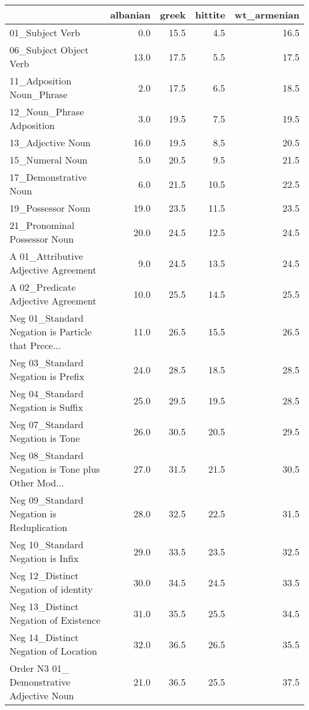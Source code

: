 \begin{tabular}{lrrrr}
\toprule
{} &  albanian &  greek &  hittite &  wt\_armenian \\
\midrule
01\_Subject Verb                                    &       0.0 &   15.5 &      4.5 &         16.5 \\
06\_Subject Object Verb                             &      13.0 &   17.5 &      5.5 &         17.5 \\
11\_Adposition Noun\_Phrase                          &       2.0 &   17.5 &      6.5 &         18.5 \\
12\_Noun\_Phrase Adposition                          &       3.0 &   19.5 &      7.5 &         19.5 \\
13\_Adjective Noun                                  &      16.0 &   19.5 &      8.5 &         20.5 \\
15\_Numeral Noun                                    &       5.0 &   20.5 &      9.5 &         21.5 \\
17\_Demonstrative Noun                              &       6.0 &   21.5 &     10.5 &         22.5 \\
19\_Possessor Noun                                  &      19.0 &   23.5 &     11.5 &         23.5 \\
21\_Pronominal Possessor Noun                       &      20.0 &   24.5 &     12.5 &         24.5 \\
A 01\_Attributive Adjective Agreement               &       9.0 &   24.5 &     13.5 &         24.5 \\
A 02\_Predicate Adjective Agreement                 &      10.0 &   25.5 &     14.5 &         25.5 \\
Neg 01\_Standard Negation is Particle that Prece... &      11.0 &   26.5 &     15.5 &         26.5 \\
Neg 03\_Standard Negation is Prefix                 &      24.0 &   28.5 &     18.5 &         28.5 \\
Neg 04\_Standard Negation is Suffix                 &      25.0 &   29.5 &     19.5 &         28.5 \\
Neg 07\_Standard Negation is Tone                   &      26.0 &   30.5 &     20.5 &         29.5 \\
Neg 08\_Standard Negation is Tone plus Other Mod... &      27.0 &   31.5 &     21.5 &         30.5 \\
Neg 09\_Standard Negation is Reduplication          &      28.0 &   32.5 &     22.5 &         31.5 \\
Neg 10\_Standard Negation is Infix                  &      29.0 &   33.5 &     23.5 &         32.5 \\
Neg 12\_Distinct Negation of identity               &      30.0 &   34.5 &     24.5 &         33.5 \\
Neg 13\_Distinct Negation of Existence              &      31.0 &   35.5 &     25.5 &         34.5 \\
Neg 14\_Distinct Negation of Location               &      32.0 &   36.5 &     26.5 &         35.5 \\
Order N3 01\_ Demonstrative Adjective Noun          &      21.0 &   36.5 &     25.5 &         37.5 \\
\bottomrule
\end{tabular}
